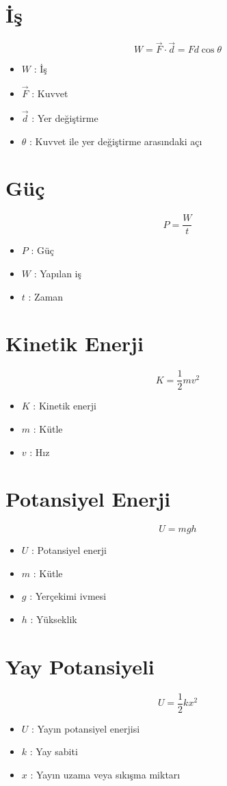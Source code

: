\documentclass[a4paper, 11pt, titlepage]{article}
\begin{document}
\section{İş}
\[
W = \vec{F} \cdot \vec{d} = F d \cos \theta
\]
\begin{itemize}
  \item $W$ : İş
  \item $\vec{F}$ : Kuvvet
  \item $\vec{d}$ : Yer değiştirme
  \item $\theta$ : Kuvvet ile yer değiştirme arasındaki açı
\end{itemize}

\section{Güç}
\[
P = \frac{W}{t}
\]
\begin{itemize}
  \item $P$ : Güç
  \item $W$ : Yapılan iş
  \item $t$ : Zaman
\end{itemize}

\section{Kinetik Enerji}
\[
K = \frac{1}{2} m v^2
\]
\begin{itemize}
  \item $K$ : Kinetik enerji
  \item $m$ : Kütle
  \item $v$ : Hız
\end{itemize}

\section{Potansiyel Enerji}
\[
U = m g h
\]
\begin{itemize}
  \item $U$ : Potansiyel enerji
  \item $m$ : Kütle
  \item $g$ : Yerçekimi ivmesi
  \item $h$ : Yükseklik
\end{itemize}

\section{Yay Potansiyeli}
\[
U = \frac{1}{2} k x^2
\]
\begin{itemize}
  \item $U$ : Yayın potansiyel enerjisi
  \item $k$ : Yay sabiti
  \item $x$ : Yayın uzama veya sıkışma miktarı
\end{itemize}
\end{document}
